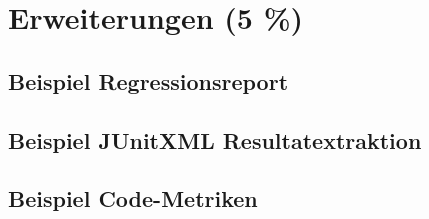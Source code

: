 \chapter{Erweiterungen (5 \%)}
\section{Beispiel Regressionsreport}
\section{Beispiel JUnitXML Resultatextraktion}
\section{Beispiel Code-Metriken}
